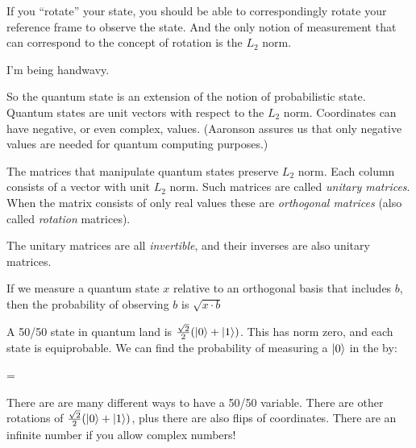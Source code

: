 \begin{remark}
  If you ``rotate'' your state, you should be able to correspondingly
  rotate your reference frame to observe the state. And the only notion
  of measurement that can correspond to the concept of rotation is the
  $L_2$ norm.

  I'm being handwavy.
\end{remark}

\begin{remark}
  So the quantum state is an extension of the notion of probabilistic
  state. Quantum states are unit vectors with respect to the $L_2$ norm.
  Coordinates can have negative, or even complex, values. (Aaronson
  assures us that only negative values are needed for quantum computing
  purposes.)

  The matrices that manipulate quantum states preserve $L_2$ norm. Each
  column consists of a vector with unit $L_2$ norm. Such matrices are
  called \emph{unitary matrices}. When the matrix consists of only real
  values these are \emph{orthogonal matrices} (also called
  \emph{rotation} matrices).

  The unitary matrices are all \emph{invertible}, and their inverses are
  also unitary matrices.
\end{remark}

\begin{remark}
  If we measure a quantum state $x$ relative to an orthogonal basis that
  includes $b$, then the probability of observing $b$ is $\sqrt{x \cdot
  b}$
\end{remark}

\begin{example}
  A 50/50 state in quantum land is $\frac{\sqrt{2}}{2}
  \mathopen{}\left( {|0\rangle + |1\rangle} \right)\mathclose{}$. This has norm zero, and each state
  is equiprobable. We can find the probability of measuring a
  $|0\rangle$ in the  by:

  \begin{nedqn}
  \eqcol
    \parensq{\sqtot}
  =
  \end{nedqn}

  There are are many different ways to have a 50/50 variable. There are
  other rotations of $\frac{\sqrt{2}}{2} \mathopen{}\left( {|0\rangle +
  |1\rangle} \right)\mathclose{}$, plus there are also flips of coordinates. There are an
  infinite number if you allow complex numbers!
\end{example}

